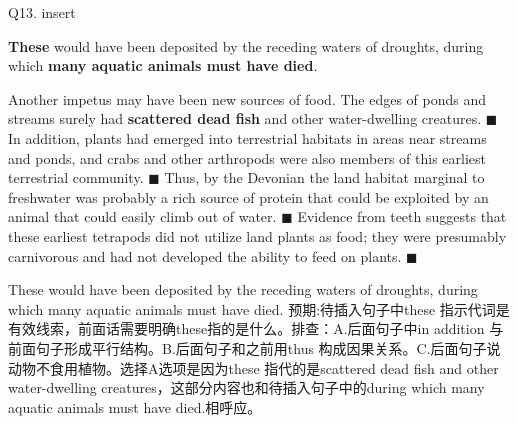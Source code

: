 \begin{blk}
    \begin{qst}
        Q13. insert

        \textbf{These} would have been deposited by the receding waters of droughts, during which \textbf{many aquatic animals must have died}.
    \end{qst}

    \begin{psgq}
        Another impetus may have been new sources of food. The edges of ponds and streams surely had \textbf{scattered dead fish} and other water-dwelling creatures. $\blacksquare$ In addition, plants had emerged into terrestrial habitats in areas near streams and ponds, and crabs and other arthropods were also members of this earliest terrestrial community. $\blacksquare$ Thus, by the Devonian the land habitat marginal to freshwater was probably a rich source of protein that could be exploited by an animal that could easily climb out of water. $\blacksquare$ Evidence from teeth suggests that these earliest tetrapods did not utilize land plants as food; they were presumably carnivorous and had not developed the ability to feed on plants. $\blacksquare$
    \end{psgq}

    \begin{nlz}
        These would have been deposited by the receding waters of droughts, during which many aquatic animals must have died. 预期:待插入句子中these 指示代词是有效线索，前面话需要明确these指的是什么。排查：A.后面句子中in addition 与前面句子形成平行结构。B.后面句子和之前用thus 构成因果关系。C.后面句子说动物不食用植物。选择A选项是因为these 指代的是scattered dead fish and other water-dwelling creatures，这部分内容也和待插入句子中的during which many aquatic animals must have died.相呼应。
    \end{nlz}
\end{blk}

\newpage
